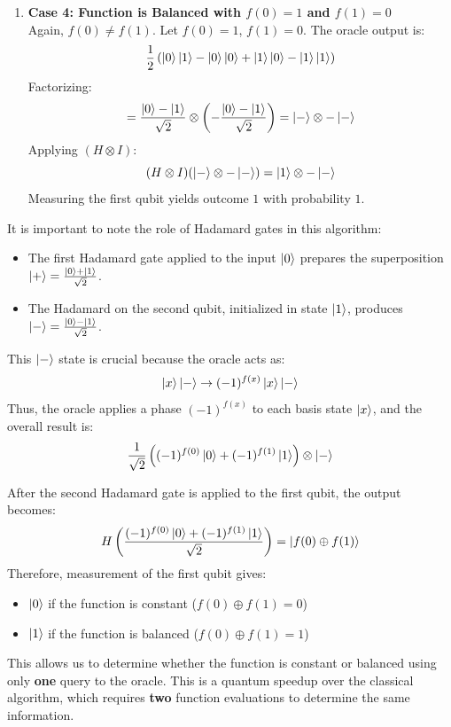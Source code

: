 \begin{enumerate}
    \item \textbf{Case 4: Function is Balanced with $f(0)=1$ and $f(1)=0$} \\
    Again, $f(0) \neq f(1)$. Let $f(0) = 1$, $f(1) = 0$. The oracle output is:
    \[
        \frac{1}{2}\left(\ket{0}\ket{1} - \ket{0}\ket{0} + \ket{1}\ket{0} - \ket{1}\ket{1}\right)
    \]
    Factorizing:
    \[
        = \frac{\ket{0} - \ket{1}}{\sqrt{2}} \otimes \left(-\frac{\ket{0} - \ket{1}}{\sqrt{2}}\right) = \ket{-} \otimes -\ket{-}
    \]
    Applying $(H \otimes I)$:
    \[
        (H \otimes I)(\ket{-} \otimes -\ket{-}) = \ket{1} \otimes -\ket{-}
    \]
    Measuring the first qubit yields outcome $1$ with probability $1$.
\end{enumerate}

\vspace{0.5cm}
It is important to note the role of Hadamard gates in this algorithm:

\begin{itemize}
    \item The first Hadamard gate applied to the input $\ket{0}$ prepares the superposition $\ket{+} = \frac{\ket{0} + \ket{1}}{\sqrt{2}}$.
    \item The Hadamard on the second qubit, initialized in state $\ket{1}$, produces $\ket{-} = \frac{\ket{0} - \ket{1}}{\sqrt{2}}$.
\end{itemize}

This $\ket{-}$ state is crucial because the oracle acts as:
\[
    \ket{x}\ket{-} \rightarrow (-1)^{f(x)}\ket{x}\ket{-}
\]
Thus, the oracle applies a phase $(-1)^{f(x)}$ to each basis state $\ket{x}$, and the overall result is:
\[
    \frac{1}{\sqrt{2}} \left( (-1)^{f(0)}\ket{0} + (-1)^{f(1)}\ket{1} \right) \otimes \ket{-}
\]

After the second Hadamard gate is applied to the first qubit, the output becomes:
\[
    H\left( \frac{(-1)^{f(0)}\ket{0} + (-1)^{f(1)}\ket{1}}{\sqrt{2}} \right) = \ket{f(0) \oplus f(1)}
\]
Therefore, measurement of the first qubit gives:

\begin{itemize}
    \item $\ket{0}$ if the function is constant ($f(0) \oplus f(1) = 0$)
    \item $\ket{1}$ if the function is balanced ($f(0) \oplus f(1) = 1$)
\end{itemize}

This allows us to determine whether the function is constant or balanced using only \textbf{one} query to the oracle. This is a quantum speedup over the classical algorithm, which requires \textbf{two} function evaluations to determine the same information.

